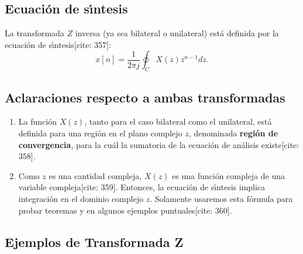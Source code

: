 \documentclass[11pt,a4paper,openany]{book}
\begin{document}
\subsection{Ecuaci\'{o}n de s\'{\i}ntesis}
La transformada $Z$ inversa (ya sea bilateral o unilateral) est\'{a} definida por la ecuaci\'{o}n de s\'{\i}ntesis[cite: 357]:
\begin{equation}
	x[n] = \frac{1}{2\pi j} \oint_{C} X(z) z^{n-1} dz.
\end{equation}

\subsection{Aclaraciones respecto a ambas transformadas}

\begin{enumerate}
	\item La funci\'{o}n $X(z)$, tanto para el caso bilateral como el unilateral, est\'{a} definida para una regi\'{o}n en el plano complejo $z$, denominada \textbf{regi\'{o}n de convergencia}, para la cu\'{a}l la sumatoria de la ecuaci\'{o}n de an\'{a}lisis existe[cite: 358].
	\item Como $z$ es una cantidad compleja, $X(z)$ es una funci\'{o}n compleja de una variable compleja[cite: 359]. Entonces, la ecuaci\'{o}n de s\'{\i}ntesis implica integraci\'{o}n en el dominio complejo $z$. Solamente usaremos esta f\'{o}rmula para probar teoremas y en algunos ejemplos puntuales[cite: 360].
\end{enumerate}

\subsection{Ejemplos de Transformada Z} \label{zetaejemplouno}
\end{document}
